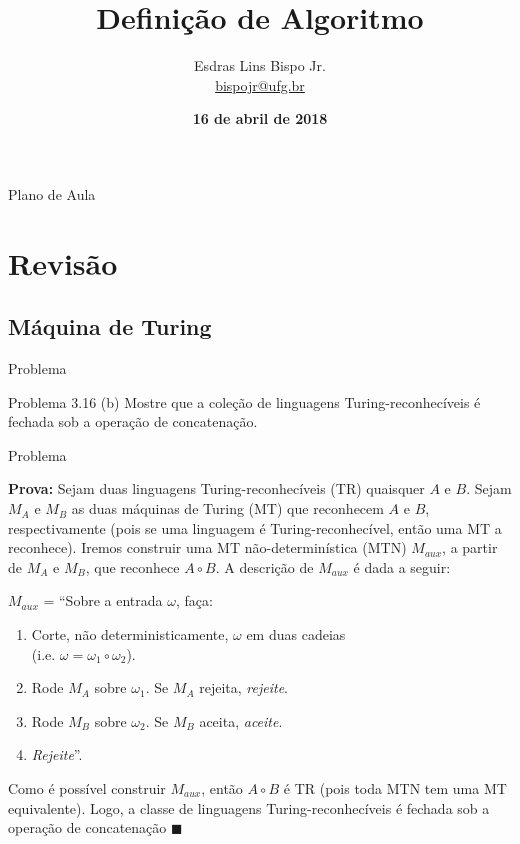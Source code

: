 \documentclass[xcolor=dvipsnames,table]{beamer}
\title{Definição de Algoritmo}
\author{
  Esdras Lins Bispo Jr. \\ \url{bispojr@ufg.br}
  }
\institute{
  Teoria da Computação \\Bacharelado em Ciência da Computação}
\date{\textbf{16 de abril de 2018} }
\begin{document}
	\begin{frame}
		\titlepage
	\end{frame}

	\AtBeginSection{
		\begin{frame}{Sumário}%
    		\tableofcontents[currentsection]
		\end{frame}
	}

	\begin{frame}{Plano de Aula}
		\tableofcontents
	\end{frame}
	
	
	\section{Revisão}
	
	\subsection{Máquina de Turing}
	\begin{frame}{Problema}
		\begin{block}{Problema 3.16 (b)}
			Mostre que a coleção de linguagens Turing-reconhecíveis é fechada sob a operação de concatenação.		
		\end{block}
	\end{frame}
	
	\begin{frame}{Problema} 
		
		{\bf Prova:} Sejam duas linguagens Turing-reconhecíveis (TR) quaisquer $A$ e $B$.   Sejam $M_A$ e $M_B$ as duas máquinas de Turing (MT) que reconhecem $A$ e $B$, respectivamente   (pois se uma linguagem é Turing-reconhecível, então uma MT a reconhece).   Iremos construir uma MT não-determinística (MTN) $M_{aux}$, a partir de $M_A$ e $M_B$, que reconhece $A \circ B$.   A descrição de $M_{aux}$ é dada a seguir:  
		
		$M_{aux}$ = ``Sobre a entrada $\omega$, faça:  
		\begin{enumerate}
			\item Corte, não deterministicamente, $\omega$ em duas cadeias \\(i.e. $\omega = \omega_1 \circ \omega_2$).  
			\item Rode $M_A$ sobre $\omega_1$. Se $M_A$ rejeita, {\it rejeite}.  
			\item Rode $M_B$ sobre $\omega_2$. Se $M_B$ aceita, {\it aceite}.  
			\item {\it Rejeite}''.
		\end{enumerate}  
		
		Como é possível construir $M_{aux}$, então $A \circ B$ é TR   (pois toda MTN tem uma MT equivalente).   Logo, a classe de linguagens Turing-reconhecíveis é fechada sob a operação de concatenação $\blacksquare$
	\end{frame}
	
\end{document}
